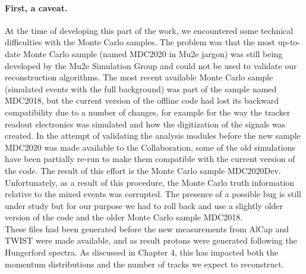 \documentclass[12pt,a4paper,openright, oneside, titlepage]{book} %
\begin{document}
\paragraph{First, a caveat.} 
At the time of developing this part of the work, we encountered some
technical difficulties with the Monte Carlo samples. 
The problem was that
the most up-to-date Monte Carlo sample (named MDC2020 in Mu2e jargon) 
was still being developed by the Mu2e Simulation Group
and could not be used to validate our reconstruction algorithms. 
The most recent available Monte Carlo sample (simulated events with the full background) 
was part of the sample named MDC2018, 
but the current version of the offline code 
had lost its backward compatibility due to a number of changes, 
for example for the way the tracker readout electronics was simulated 
and how the digitization of the signals  was created. 
In the attempt of validating the analysis modules before the new sample MDC2020 
was made available to the Collaboration, 
some of the old simulations have been partially re-run to make them compatible 
with the current version of the code. 
The result of this effort is the Monte Carlo sample MDC2020Dev.
Unfortunately, as a result of this procedure, 
the Monte Carlo truth information relative to the mixed events was corrupted. 
The presence of a possible bug is still under study but for our purpose 
we had to roll back and use a slightly older version of the code 
and the older Monte Carlo sample MDC2018. \\
These files had been generated before the new measurements 
from AlCap and TWIST were made available,
and as result protons were generated following the Hungerford spectra. 
As discussed in Chapter 4, this has impacted both the momentum distributions 
and the number of tracks we expect to reconstruct. \\
\end{document}
